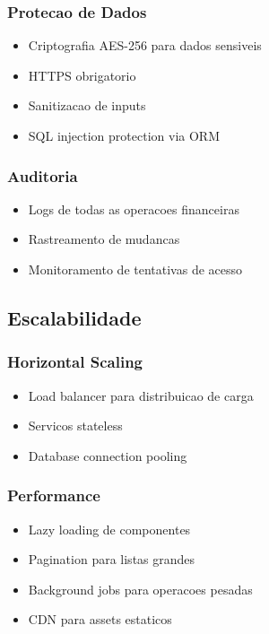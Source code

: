 \subsubsection{Protecao de Dados}
\begin{itemize}
    \item Criptografia AES-256 para dados sensiveis
    \item HTTPS obrigatorio
    \item Sanitizacao de inputs
    \item SQL injection protection via ORM
\end{itemize}

\subsubsection{Auditoria}
\begin{itemize}
    \item Logs de todas as operacoes financeiras
    \item Rastreamento de mudancas
    \item Monitoramento de tentativas de acesso
\end{itemize}

\subsection{Escalabilidade}

\subsubsection{Horizontal Scaling}
\begin{itemize}
    \item Load balancer para distribuicao de carga
    \item Servicos stateless
    \item Database connection pooling
\end{itemize}

\subsubsection{Performance}
\begin{itemize}
    \item Lazy loading de componentes
    \item Pagination para listas grandes
    \item Background jobs para operacoes pesadas
    \item CDN para assets estaticos
\end{itemize}
